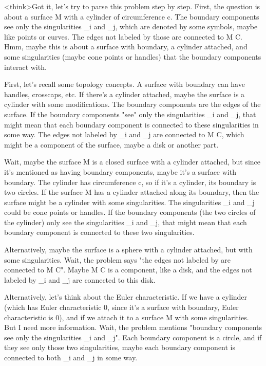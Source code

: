 <think>Got it, let's try to parse this problem step by step. First, the question is about a surface M with a cylinder of circumference c. The boundary components see only the singularities _i and _j, which are denoted by some symbols, maybe like points or curves. The edges not labeled by those are connected to M C. Hmm, maybe this is about a surface with boundary, a cylinder attached, and some singularities (maybe cone points or handles) that the boundary components interact with. 

First, let's recall some topology concepts. A surface with boundary can have handles, crosscaps, etc. If there's a cylinder attached, maybe the surface is a cylinder with some modifications. The boundary components are the edges of the surface. If the boundary components "see" only the singularities _i and _j, that might mean that each boundary component is connected to these singularities in some way. The edges not labeled by _i and _j are connected to M C, which might be a component of the surface, maybe a disk or another part. 

Wait, maybe the surface M is a closed surface with a cylinder attached, but since it's mentioned as having boundary components, maybe it's a surface with boundary. The cylinder has circumference c, so if it's a cylinder, its boundary is two circles. If the surface M has a cylinder attached along its boundary, then the surface might be a cylinder with some singularities. The singularities _i and _j could be cone points or handles. If the boundary components (the two circles of the cylinder) only see the singularities _i and _j, that might mean that each boundary component is connected to these two singularities. 

Alternatively, maybe the surface is a sphere with a cylinder attached, but with some singularities. Wait, the problem says "the edges not labeled by are connected to M C". Maybe M C is a component, like a disk, and the edges not labeled by _i and _j are connected to this disk. 

Alternatively, let's think about the Euler characteristic. If we have a cylinder (which has Euler characteristic 0, since it's a surface with boundary, Euler characteristic is 0), and if we attach it to a surface M with some singularities. But I need more information. Wait, the problem mentions "boundary components see only the singularities _i and _j". Each boundary component is a circle, and if they see only those two singularities, maybe each boundary component is connected to both _i and _j in some way. 

